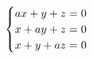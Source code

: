 \documentclass[preview]{standalone}
\begin{document}
\begin{align*}
\special{dvisvgm:raw <g id='unique000'>}\begin{cases}ax+y+z=0\\x+ay+z=0\\x+y+az=0\end{cases}\special{dvisvgm:raw </g>}
\end{align*}
\end{document}
